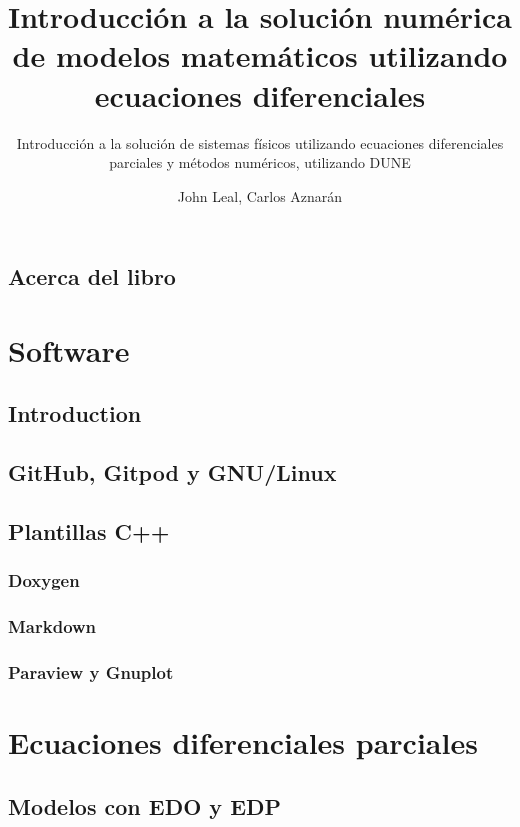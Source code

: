 \documentclass[10pt,
	a4paper,
	spanish,
	titlepage=firstiscover,
	titlepage=true,
	BCOR=2cm,
	DIV=12
]{scrbook}
\author{John Leal, Carlos Aznarán}
\title{Introducción a la solución numérica de modelos matemáticos utilizando ecuaciones 
	diferenciales}
\subtitle{Introducción a la solución de sistemas físicos utilizando ecuaciones diferenciales 
	parciales y métodos numéricos, utilizando DUNE}
\begin{document}

\tableofcontents

\begin{refsection}
	\chapter*{Acerca del libro}
	
	\part{Software} %
	\chapter{Introduction}
	
	\chapter{GitHub, Gitpod y GNU/Linux}
	
	\chapter{Plantillas C++}
	\section{Doxygen}
	\section{Markdown}
	\section{Paraview y Gnuplot}
	\part{Ecuaciones diferenciales parciales} %
	\chapter{Modelos con EDO y EDP}
	

\end{refsection}
\end{document}

